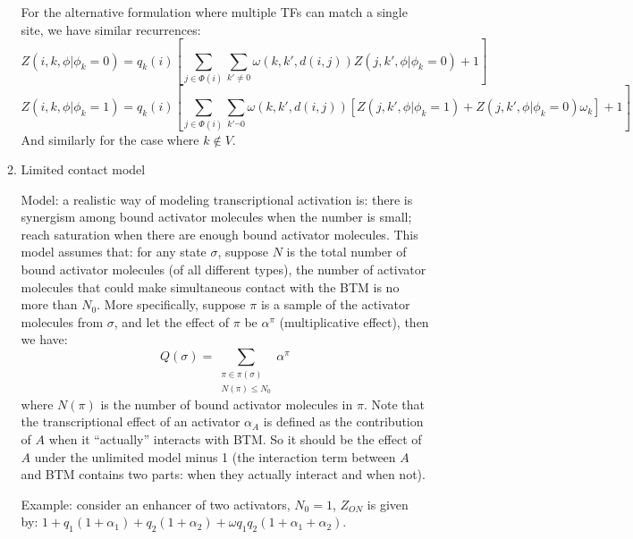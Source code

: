 \documentclass[11pt]{article}
\begin{document}
\begin{enumerate}
\begin{enumerate}
For the alternative formulation where multiple TFs can match a single site, we have similar recurrences: 
\begin{equation}
Z(i,k,\phi|\phi_{k}=0) = q_{k}(i) \left[ \sum_{j \in \Phi (i)} \sum_{k' \neq 0} \omega(k, k', d(i,j)) Z(j,k',\phi|\phi_{k}=0) + 1\right]
\end{equation} 
\begin{equation}
Z(i,k,\phi|\phi_{k}=1) = q_{k}(i) \left[ \sum_{j \in \Phi (i)} \sum_{k' \neg 0} \omega(k, k', d(i,j)) [Z(j,k',\phi|\phi_{k}=1) +  Z(j,k',\phi|\phi_{k}=0) \omega_{k}] + 1 \right]
\end{equation}
And similarly for the case where $k \notin V$. 

\item{Limited contact model}

Model: a realistic way of modeling transcriptional activation is: there is synergism among bound activator molecules when the number is small; reach saturation when there are enough bound activator molecules. This model assumes that: for any state $\sigma$, suppose $N$ is the total number of bound activator molecules (of all different types), the number of activator molecules that could make simultaneous contact with the BTM is no more than $N_0$. More specifically, suppose $\pi$ is a sample of the activator molecules from $\sigma$, and let the effect of $\pi$ be $\alpha^\pi$ (multiplicative effect), then we have: 
\begin{equation}
Q(\sigma) = \sum_{\substack{\pi \in \pi(\sigma)\\N(\pi) \leq N_0}} \alpha^\pi
\end{equation}
where $N(\pi)$ is the number of bound activator molecules in $\pi$. Note that the transcriptional effect of an activator $\alpha_A$ is defined as the contribution of $A$ when it ``actually'' interacts with BTM. So it should be the effect of $A$ under the unlimited model minus 1 (the interaction term between $A$ and BTM contains two parts: when they actually interact and when not). 

Example: consider an enhancer of two activators, $N_0 = 1$, $Z_{ON}$ is given by: $1 + q_1( 1 + \alpha_1) + q_2( 1 + \alpha_2) + \omega q_1 q_2 (1 + \alpha_1 + \alpha_2)$. 


\end{enumerate}
\end{enumerate}
\end{document}
